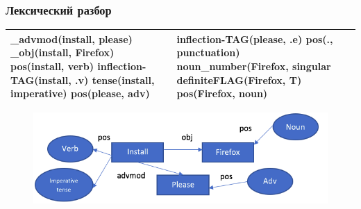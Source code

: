 \documentclass[14pt]{beamer}
\begin{document}
\begin{frame}
\frametitle{Лексический разбор}
\begin{table}
	
\small
\begin{tabular} {|p{5cm}|p{5cm}|}

\hline
 
\_advmod(install, please)
\_obj(install, Firefox)
pos(install, verb)
inflection-TAG(install, .v)
tense(install, imperative)
pos(please, adv)
 & 
inflection-TAG(please, .e)
pos(., punctuation)
noun\_number(Firefox, singular
definite\-FLAG(Firefox, T)
pos(Firefox, noun) 
    \\
   \hline
     
\end{tabular}
\end{table}

\begin{figure} [h] 
  \center
  \includegraphics [scale=0.5] {LexicalGraph1}
  \label{img:LexicalGraph1}  
\end{figure}
\end{frame}

\end{document}
